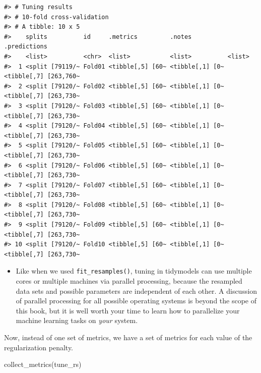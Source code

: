 \documentclass[
]{krantz}
\makeatletter
\newenvironment{Shaded}{\begin{snugshade}}{\end{snugshade}}
\newcommand{\FunctionTok}[1]{\textcolor[rgb]{0.00,0.00,0.00}{#1}}
\newcommand{\NormalTok}[1]{#1}
\newenvironment{kframe}{%
\medskip{}
\setlength{\fboxsep}{.8em}
 \def\at@end@of@kframe{}%
 \ifinner\ifhmode%
  \def\at@end@of@kframe{\end{minipage}}%
  \begin{minipage}{\columnwidth}%
 \fi\fi%
 \def\FrameCommand##1{\hskip\@totalleftmargin \hskip-\fboxsep
 \colorbox{shadecolor}{##1}\hskip-\fboxsep
     \hskip-\linewidth \hskip-\@totalleftmargin \hskip\columnwidth}%
 \MakeFramed {\advance\hsize-\width
   \@totalleftmargin\z@ \linewidth\hsize
   \@setminipage}}%
 {\par\unskip\endMakeFramed%
 \at@end@of@kframe}
\renewenvironment{Shaded}{\begin{kframe}}{\end{kframe}}
\newenvironment{rmdblock}[1]
  {\begin{shaded*}
  \begin{itemize}[left = -1cm, labelsep = 1cm]
  \renewcommand{\labelitemi}{
    \raisebox{-.7\height}[0pt][0pt]{
      {\setkeys{Gin}{width=3em,keepaspectratio}\texttt{[image: images/\#1]}}
    }
  }
 
  \item
  }
  {
  \end{itemize}
  \end{shaded*}
  }
\newenvironment{rmdwarning}
  {\begin{rmdblock}{warning}}
  {\end{rmdblock}}
\makeatother
\begin{document}
\begin{verbatim}
#> # Tuning results
#> # 10-fold cross-validation 
#> # A tibble: 10 x 5
#>    splits          id     .metrics         .notes          .predictions         
#>    <list>          <chr>  <list>           <list>          <list>               
#>  1 <split [79119/~ Fold01 <tibble[,5] [60~ <tibble[,1] [0~ <tibble[,7] [263,760~
#>  2 <split [79120/~ Fold02 <tibble[,5] [60~ <tibble[,1] [0~ <tibble[,7] [263,730~
#>  3 <split [79120/~ Fold03 <tibble[,5] [60~ <tibble[,1] [0~ <tibble[,7] [263,730~
#>  4 <split [79120/~ Fold04 <tibble[,5] [60~ <tibble[,1] [0~ <tibble[,7] [263,730~
#>  5 <split [79120/~ Fold05 <tibble[,5] [60~ <tibble[,1] [0~ <tibble[,7] [263,730~
#>  6 <split [79120/~ Fold06 <tibble[,5] [60~ <tibble[,1] [0~ <tibble[,7] [263,730~
#>  7 <split [79120/~ Fold07 <tibble[,5] [60~ <tibble[,1] [0~ <tibble[,7] [263,730~
#>  8 <split [79120/~ Fold08 <tibble[,5] [60~ <tibble[,1] [0~ <tibble[,7] [263,730~
#>  9 <split [79120/~ Fold09 <tibble[,5] [60~ <tibble[,1] [0~ <tibble[,7] [263,730~
#> 10 <split [79120/~ Fold10 <tibble[,5] [60~ <tibble[,1] [0~ <tibble[,7] [263,730~
\end{verbatim}

\begin{rmdwarning}
Like when we used \texttt{fit\_resamples()}, tuning in tidymodels can
use multiple cores or multiple machines via parallel processing, because
the resampled data sets and possible parameters are independent of each
other. A discussion of parallel processing for all possible operating
systems is beyond the scope of this book, but it is well worth your time
to learn how to parallelize your machine learning tasks on \emph{your}
system.
\end{rmdwarning}


Now, instead of one set of metrics, we have a set of metrics for each value of the regularization penalty.

\begin{Shaded}
\begin{Highlighting}[]
\FunctionTok{collect\_metrics}\NormalTok{(tune\_rs)}
\end{Highlighting}
\end{Shaded}
\end{document}
